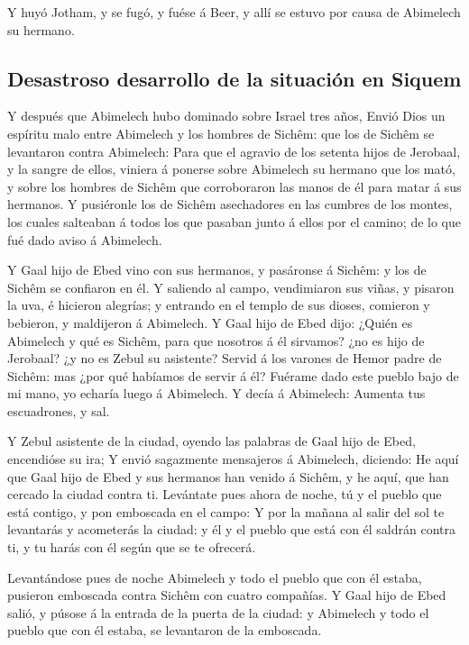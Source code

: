  Y huyó Jotham, y se fugó, y fuése á Beer, y allí se
estuvo por causa de Abimelech su hermano.

\hypertarget{desastroso-desarrollo-de-la-situaciuxf3n-en-siquem}{%
\subsection{Desastroso desarrollo de la situación en
Siquem}\label{desastroso-desarrollo-de-la-situaciuxf3n-en-siquem}}

 Y después que Abimelech hubo dominado sobre Israel tres
años,  Envió Dios un espíritu malo entre Abimelech y los
hombres de Sichêm: que los de Sichêm se levantaron contra Abimelech:
 Para que el agravio de los setenta hijos de Jerobaal, y
la sangre de ellos, viniera á ponerse sobre Abimelech su hermano que los
mató, y sobre los hombres de Sichêm que corroboraron las manos de él
para matar á sus hermanos.  Y pusiéronle los de Sichêm
asechadores en las cumbres de los montes, los cuales salteaban á todos
los que pasaban junto á ellos por el camino; de lo que fué dado aviso á
Abimelech.

 Y Gaal hijo de Ebed vino con sus hermanos, y pasáronse á
Sichêm: y los de Sichêm se confiaron en él.  Y saliendo
al campo, vendimiaron sus viñas, y pisaron la uva, é hicieron alegrías;
y entrando en el templo de sus dioses, comieron y bebieron, y maldijeron
á Abimelech.  Y Gaal hijo de Ebed dijo: ¿Quién es
Abimelech y qué es Sichêm, para que nosotros á él sirvamos? ¿no es hijo
de Jerobaal? ¿y no es Zebul su asistente? Servid á los varones de Hemor
padre de Sichêm: mas ¿por qué habíamos de servir á él? 
Fuérame dado este pueblo bajo de mi mano, yo echaría luego á Abimelech.
Y decía á Abimelech: Aumenta tus escuadrones, y sal.

 Y Zebul asistente de la ciudad, oyendo las palabras de
Gaal hijo de Ebed, encendióse su ira;  Y envió sagazmente
mensajeros á Abimelech, diciendo: He aquí que Gaal hijo de Ebed y sus
hermanos han venido á Sichêm, y he aquí, que han cercado la ciudad
contra ti.  Levántate pues ahora de noche, tú y el pueblo
que está contigo, y pon emboscada en el campo:  Y por la
mañana al salir del sol te levantarás y acometerás la ciudad: y él y el
pueblo que está con él saldrán contra ti, y tu harás con él según que se
te ofrecerá.

 Levantándose pues de noche Abimelech y todo el pueblo
que con él estaba, pusieron emboscada contra Sichêm con cuatro
compañías.  Y Gaal hijo de Ebed salió, y púsose á la
entrada de la puerta de la ciudad: y Abimelech y todo el pueblo que con
él estaba, se levantaron de la emboscada.


